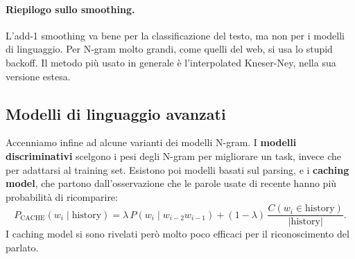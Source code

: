 \paragraph{Riepilogo sullo smoothing.} L'add-1 smoothing va bene per la classificazione del testo, ma non per i modelli di linguaggio. Per N-gram molto grandi, come quelli del web, si usa lo stupid backoff. Il metodo più usato in generale è l'interpolated Kneser-Ney, nella sua versione estesa.

\subsection{Modelli di linguaggio avanzati}
Accenniamo infine ad alcune varianti dei modelli N-gram. I \textbf{modelli discriminativi} scelgono i pesi degli N-gram per migliorare un task, invece che per adattarsi al training set. Esistono poi modelli basati sul parsing, e i \textbf{caching model}, che partono dall'osservazione che le parole usate di recente hanno più probabilità di ricomparire:
\begin{equation}
P_{\text{CACHE}}(w_i \mid \text{history}) = \lambda\, P(w_i \mid w_{i-2} w_{i-1}) + (1 - \lambda)\, \frac{C(w_i \in \text{history})}{|\text{history}|}.
\end{equation}
I caching model si sono rivelati però molto poco efficaci per il riconoscimento del parlato.
